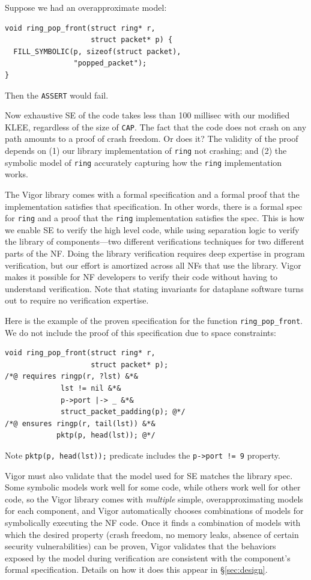\documentclass[letterpaper,twocolumn,10pt]{article}
\newcommand{\code}[1]{\lstinline{#1}}
\begin{document}
Suppose we had an overapproximate model:
\begin{lstlisting}
void ring_pop_front(struct ring* r,
                    struct packet* p) {
  FILL_SYMBOLIC(p, sizeof(struct packet),
                "popped_packet");
}
\end{lstlisting}
Then the \code{ASSERT} would fail.

Now exhaustive SE of the code takes less than 100 millisec with our modified KLEE, regardless of the size of \code{CAP}.  The fact that the code does not crash on any path amounts to a proof of crash freedom. Or does it? The validity of the proof depends on (1)  our library implementation of \code{ring} not crashing; and (2) the symbolic model of \code{ring} accurately capturing how the \code{ring} implementation works.

The Vigor library comes with a formal specification and a formal proof that the implementation satisfies that specification. In other words, there is a formal spec for \code{ring} and a proof that the \code{ring} implementation satisfies the spec. This is how we enable SE to verify the high level code, while using separation logic to verify the library of components---two different verifications techniques for two different parts of the NF. Doing the library verification requires deep expertise in program verification, but our effort is amortized across all NFs that use the library. Vigor makes it possible for NF developers to verify their code without having to understand verification. Note that stating invariants for dataplane software turns out to require no verification expertise.

Here is the example of the proven specification for the function
\code{ring_pop_front}. We do not include the proof of this specification due to
space constraints:

\begin{lstlisting}
void ring_pop_front(struct ring* r,
                    struct packet* p);
/*@ requires ringp(r, ?lst) &*&
             lst != nil &*&
             p->port |-> _ &*&
             struct_packet_padding(p); @*/
/*@ ensures ringp(r, tail(lst)) &*&
            pktp(p, head(lst)); @*/
\end{lstlisting}

Note \code{pktp(p, head(lst));} predicate includes the \code{p->port != 9} property.

Vigor must also validate that the model used for SE matches the library spec. Some symbolic models work well for some code, while others work well for other code, so the Vigor library comes with {\em multiple} simple, overapproximating models for each component, and Vigor automatically chooses combinations of models for symbolically executing the NF code. Once it finds a combination of models with which the desired property (crash freedom, no memory leaks, absence of certain security vulnerabilities) can be proven, Vigor validates that the behaviors exposed by the model during verification are consistent with the component's formal specification.  Details on how it does this appear in \S\ref{sec:design}.
\end{document}

